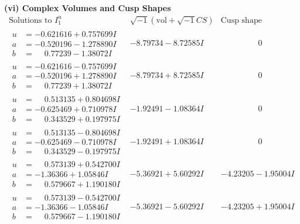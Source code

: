 \documentclass[1p]{elsarticle_modified}
\theoremstyle{definition}
\newcommand{\I}{\sqrt{-1}}
\begin{document}
\newpage\flushleft \textbf{(vi) Complex Volumes and Cusp Shapes}
$$\begin{array}{c|c|c}  
\text{Solutions to }I^u_{1}& \I (\text{vol} + \sqrt{-1}CS) & \text{Cusp shape}\\
 \hline 
\begin{aligned}
u &= -0.621616 + 0.757699 I \\
a &= -0.520196 - 1.278890 I \\
b &= \phantom{-}0.77239 - 1.38072 I\end{aligned}
 & -8.79734 - 8.72585 I & \phantom{-0.000000 } 0 \\ \hline\begin{aligned}
u &= -0.621616 - 0.757699 I \\
a &= -0.520196 + 1.278890 I \\
b &= \phantom{-}0.77239 + 1.38072 I\end{aligned}
 & -8.79734 + 8.72585 I & \phantom{-0.000000 } 0 \\ \hline\begin{aligned}
u &= \phantom{-}0.513135 + 0.804698 I \\
a &= -0.625469 + 0.710978 I \\
b &= \phantom{-}0.343529 + 0.197975 I\end{aligned}
 & -1.92491 - 1.08364 I & \phantom{-0.000000 } 0 \\ \hline\begin{aligned}
u &= \phantom{-}0.513135 - 0.804698 I \\
a &= -0.625469 - 0.710978 I \\
b &= \phantom{-}0.343529 - 0.197975 I\end{aligned}
 & -1.92491 + 1.08364 I & \phantom{-0.000000 } 0 \\ \hline\begin{aligned}
u &= \phantom{-}0.573139 + 0.542700 I \\
a &= -1.36366 + 1.05846 I \\
b &= \phantom{-}0.579667 + 1.190180 I\end{aligned}
 & -5.36921 + 5.60292 I & -4.23205 - 1.95004 I \\ \hline\begin{aligned}
u &= \phantom{-}0.573139 - 0.542700 I \\
a &= -1.36366 - 1.05846 I \\
b &= \phantom{-}0.579667 - 1.190180 I\end{aligned}
 & -5.36921 - 5.60292 I & -4.23205 + 1.95004 I \\ \hline\begin{aligned}

\end{aligned}
\end{array}$$
\end{document}
